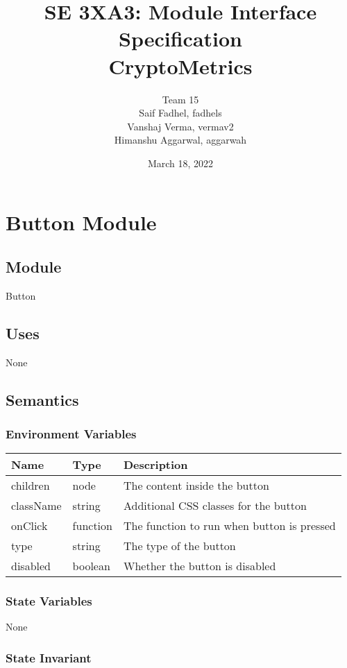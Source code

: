 \documentclass[12pt]{article}
\title{SE 3XA3: Module Interface Specification\\CryptoMetrics}
\author{Team 15
		\\ Saif Fadhel, fadhels
		\\ Vanshaj Verma, vermav2
		\\ Himanshu Aggarwal, aggarwah
}
\date{March 18, 2022}
\begin{document}
\maketitle


\newpage
\tableofcontents

\newpage 
\section{Button Module}

\subsection{Module}
Button

\subsection{Uses}
None

\subsection{Semantics}

\subsubsection{Environment Variables}
\begin{tabular}{| l | l | p{8cm} |}
    \hline
    \textbf{Name} & \textbf{Type} & \textbf{Description}\\ \hline
    children & node & The content inside the button\\ \hline
    className & string & Additional CSS classes for the button\\ \hline
    onClick & function & The function to run when button is pressed\\ \hline
    type & string & The type of the button\\ \hline
    disabled & boolean & Whether the button is disabled\\ \hline
\end{tabular}

\subsubsection{State Variables}
None

\subsubsection{State Invariant}
\end{document}
